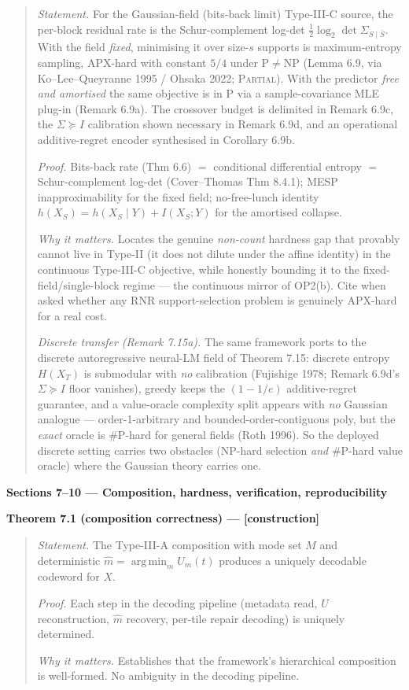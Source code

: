 \documentclass[
]{article}
\begin{document}
\begin{quote}
\emph{Statement.} For the Gaussian-field (bits-back limit) Type-III-C
source, the per-block residual rate is the Schur-complement log-det
$\tfrac12\log_2\det\Sigma_{S\mid\bar S}$. With the field \emph{fixed},
minimising it over size-$s$ supports is maximum-entropy sampling,
APX-hard with constant $5/4$ under $\mathrm{P}\neq\mathrm{NP}$
(Lemma 6.9, via Ko--Lee--Queyranne 1995 / Ohsaka 2022;
\textsc{Partial}). With the predictor \emph{free and amortised} the
same objective is in $\mathrm{P}$ via a sample-covariance MLE plug-in
(Remark 6.9a). The crossover budget is delimited in Remark 6.9c, the
$\Sigma\succeq I$ calibration shown necessary in Remark 6.9d, and an
operational additive-regret encoder synthesised in Corollary 6.9b.

\emph{Proof.} Bits-back rate (Thm 6.6) $=$ conditional differential
entropy $=$ Schur-complement log-det (Cover--Thomas Thm 8.4.1); MESP
inapproximability for the fixed field; no-free-lunch identity
$h(X_S)=h(X_S\mid Y)+I(X_S;Y)$ for the amortised collapse.

\emph{Why it matters.} Locates the genuine \emph{non-count} hardness
gap that provably cannot live in Type-II (it does not dilute under the
affine identity) in the continuous Type-III-C objective, while honestly
bounding it to the fixed-field/single-block regime --- the continuous
mirror of OP2(b). Cite when asked whether any RNR support-selection
problem is genuinely APX-hard for a real cost.

\emph{Discrete transfer (Remark 7.15a).} The same framework ports to the
discrete autoregressive neural-LM field of Theorem 7.15: discrete entropy
$H(X_T)$ is submodular with \emph{no} calibration (Fujishige 1978;
Remark 6.9d's $\Sigma\succeq I$ floor vanishes), greedy keeps the
$(1-1/e)$ additive-regret guarantee, and a value-oracle complexity split
appears with \emph{no} Gaussian analogue --- order-1-arbitrary and
bounded-order-contiguous poly, but the \emph{exact} oracle is \#P-hard for
general fields (Roth 1996). So the deployed discrete setting carries two
obstacles (NP-hard selection \emph{and} \#P-hard value oracle) where the
Gaussian theory carries one.
\end{quote}

\textbf{Sections 7--10 --- Composition, hardness, verification,
reproducibility}

\textbf{Theorem 7.1 (composition correctness) --- {[}construction{]}}

\begin{quote}
\emph{Statement.} The Type-III-A composition with mode set $M$ and
deterministic $\hat{m} = \operatorname*{arg\,min}_m U_m(t)$ produces
a uniquely decodable codeword for $X$.

\emph{Proof.} Each step in the decoding pipeline (metadata read, $U$
reconstruction, $\hat{m}$ recovery, per-tile repair decoding) is
uniquely determined.

\emph{Why it matters.} Establishes that the framework's hierarchical
composition is well-formed. No ambiguity in the decoding pipeline.
\end{quote}
\end{document}
